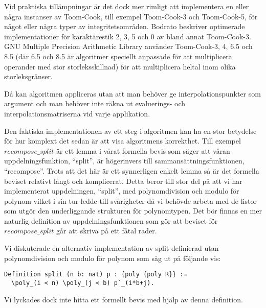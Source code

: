 Vid praktiska tillämpningar är det dock mer rimligt att implementera en eller
några instanser av Toom-Cook, till exempel Toom-Cook-3 och Toom-Cook-5, för
något eller några typer av
integritetsområden.
Bodrato\cite{bodrato2007a}\cite{bodrato2007towards}\cite{bodrato2007integer}
beskriver optimerade implementationer för karaktärestik 2, 3, 5 och 0 av bland
annat Toom-Cook-3. GNU Multiple Precision Arithmetic Library använder
Toom-Cook-3, 4, 6.5 och 8.5 (där 6.5 och 8.5 är algoritmer speciellt anpassade
för att multiplicera operander med stor storleksskillnad) för att multiplicera
heltal inom olika storleksgränser.

Då kan algoritmen appliceras utan att man behöver ge interpolationspunkter som
argument och man behöver inte räkna ut evaluerings- och
interpolationsmatriserna vid varje applikation.

Den faktiska implementationen av ett steg i algoritmen kan ha en stor betydelse
för hur komplext det sedan är att visa algoritmens korrekthet. Till exempel
$recompose\_split$ är ett lemma i vårat formella bevis som säger att våran
uppdelningsfunktion, ``split'', är högerinvers till sammansättningsfunktionen,
``recompose''. Trots att det här är ett synnerligen enkelt lemma så är det
formella beviset relativt långt och komplicerat. Detta beror till stor del på
att vi har implementerat uppdelningen, ``split'', med polynomdivision och
modulo för polynom vilket i sin tur ledde till svårigheter då vi behövde arbeta
med de listor som utgör den underliggande strukturen för polynomtypen. Det bör
finnas en mer naturlig definition av uppdelningsfunktionen som gör att beviset
för $recompose\_split$ går att skriva på ett fåtal rader.

Vi diskuterade en alternativ implementation av split definierad utan
polynomdivision och modulo för polynom som såg ut på följande vis:
\begin{lstlisting}
Definition split (n b: nat) p : {poly {poly R}} :=
  \poly_(i < n) \poly_(j < b) p`_(i*b+j).
\end{lstlisting}
Vi lyckades dock inte hitta ett formellt bevis med hjälp av denna definition.
